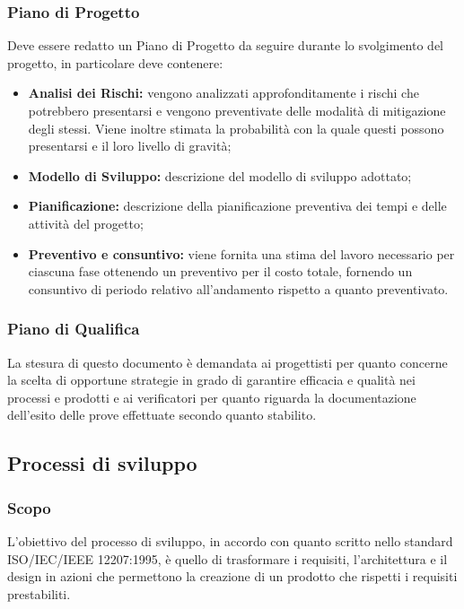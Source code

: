 \subsubsection{Piano di Progetto}
Deve essere redatto un Piano di Progetto da seguire durante lo svolgimento del progetto, in particolare deve contenere:

\begin{itemize}
  \item \textbf{Analisi dei Rischi:} vengono analizzati approfonditamente i rischi che potrebbero presentarsi e vengono preventivate delle modalità di mitigazione degli stessi. Viene inoltre stimata la probabilità con la quale questi possono presentarsi e il loro livello di gravità;
  \item \textbf{Modello di Sviluppo:} descrizione del modello di sviluppo adottato;
  \item \textbf{Pianificazione:} descrizione della pianificazione preventiva dei tempi e delle attività del progetto;
  \item \textbf{Preventivo e consuntivo:}  viene fornita una stima del lavoro necessario per ciascuna fase ottenendo un preventivo per il costo totale,  fornendo un consuntivo di periodo relativo all'andamento rispetto a quanto preventivato.
\end{itemize}

\subsubsection{Piano di Qualifica}
\label{_pianoDiQualifica}
La stesura di questo documento è demandata ai progettisti per quanto concerne la scelta di opportune strategie in grado di garantire efficacia e qualità nei processi e prodotti e ai verificatori per quanto riguarda la documentazione dell'esito delle prove effettuate secondo quanto stabilito.


\subsection{Processi di sviluppo}
\label{_processiDiSviluppo}
\subsubsection{Scopo}

L'obiettivo del processo di sviluppo, in accordo con quanto scritto nello standard ISO/IEC/IEEE 12207:1995, è quello di trasformare i requisiti, l'architettura e il design in azioni che permettono la creazione di un prodotto che rispetti i requisiti prestabiliti.

